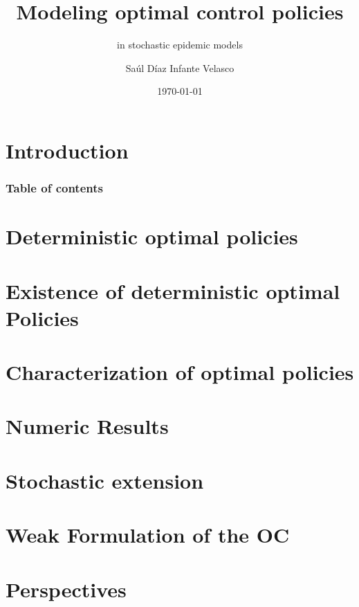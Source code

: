 \documentclass[9pt]{beamer}
\title{Modeling optimal control policies}
\subtitle{in stochastic epidemic models}
\author{Saúl Díaz Infante Velasco}
\institute{CONACYT-UNIVERSIDAD de SONORA}
\date{\today}
\begin{document}
    \titlepage
    \section{Introduction}
        
    \begin{frame}
        \frametitle{Table of contents}
        \tableofcontents
    \end{frame}
    \section{Deterministic optimal policies}
        
        
    \section{Existence of deterministic optimal Policies}
        
    \section{Characterization of optimal policies}
        
    \section{Numeric Results}
    \section{Stochastic extension}
    \section{Weak Formulation of the OC}
    \section{Perspectives}
        
\end{document}
